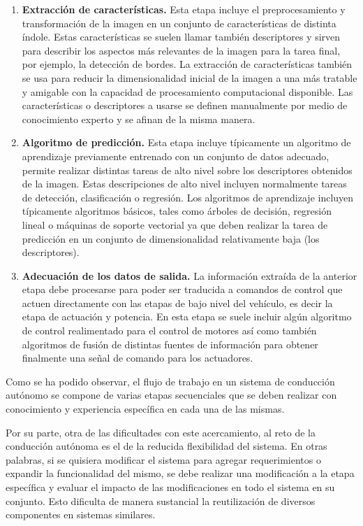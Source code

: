 \documentclass[12pt,letterpaper]{article}
\begin{document}
\begin{enumerate}
    \item \textbf{Extracción de características.} Esta etapa incluye el preprocesamiento y transformación de la imagen 
    en un conjunto de características de distinta índole. Estas características se suelen llamar también descriptores 
    y sirven para describir los aspectos más relevantes de la imagen para la tarea final, por ejemplo, la detección de bordes. 
    La extracción de características también se usa para reducir la dimensionalidad inicial de la imagen a una más tratable y 
    amigable con la capacidad de procesamiento computacional disponible. Las características o descriptores a usarse 
    se definen manualmente por medio de conocimiento experto y se afinan de la misma manera.

    \item \textbf{Algoritmo de predicción.} Esta etapa incluye típicamente un algoritmo de aprendizaje previamente 
    entrenado con un conjunto de datos adecuado, permite realizar distintas tareas de alto nivel sobre los descriptores 
    obtenidos de la imagen. Estas descripciones de alto nivel incluyen normalmente tareas de detección, 
    clasificación o regresión. Los algoritmos de aprendizaje incluyen típicamente algoritmos básicos, tales como árboles de decisión,
    regresión lineal o máquinas de soporte vectorial ya que deben realizar la tarea de predicción en un 
    conjunto de dimensionalidad relativamente baja (los descriptores).

    \item \textbf{Adecuación de los datos de salida.} La información extraída de la anterior etapa debe 
    procesarse para poder ser traducida a comandos de control que actuen directamente con las etapas 
    de bajo nivel del vehículo, es decir la etapa de actuación y potencia. En esta etapa se suele incluir algún algoritmo 
    de control realimentado para el control de motores así como también algoritmos de fusión de distintas fuentes de información
    para obtener finalmente una señal de comando para los actuadores.
\end{enumerate}

Como se ha podido observar, el flujo de trabajo en un sistema de conducción autónomo se compone de varias etapas 
secuenciales que se deben realizar con conocimiento y experiencia específica en cada una de las mismas. 

Por su parte, otra de las dificultades con este acercamiento, al reto de la conducción autónoma es el de la reducida
flexibilidad del sistema. En otras palabras, si se quisiera modificar el sistema para agregar requerimientos o 
expandir la funcionalidad del mismo, se debe realizar una modificación a la etapa específica y evaluar el impacto de 
las modificaciones en todo el sistema en su conjunto. Esto dificulta de manera sustancial la reutilización de diversos
componentes en sistemas similares.
\end{document}
